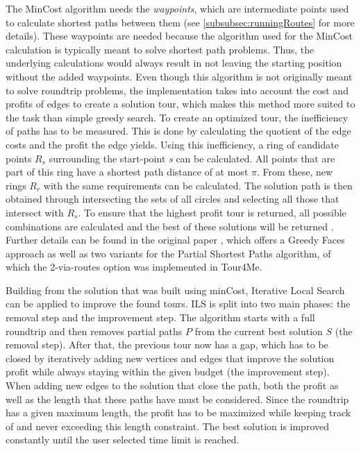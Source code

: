 The MinCost algorithm \cite{buchin_tour4me_2022, gemsa_efficient_2013} needs the \textit{waypoints}, which are intermediate points used to calculate shortest paths between them (see \ref{subsubsec:runningRoutes} for more details).
These waypoints are needed because the algorithm used for the MinCost calculation is typically meant to solve shortest path problems. 
Thus, the underlying calculations would always result in not leaving the starting position without the added waypoints. 
Even though this algorithm is not originally meant to solve roundtrip problems, the implementation takes into account the cost and profits of edges to create a solution tour, which makes this method more suited to the task than simple greedy search.
To create an optimized tour, the inefficiency of paths has to be measured. 
This is done by calculating the quotient of the edge costs and the profit the edge yields. 
Using this inefficiency, a ring of candidate points $R_s$ surrounding the start-point \textit{s} can be calculated.
All points that are part of this ring have a shortest path distance of at most $\pi$.
From these, new rings $R_r$ with the same requirements can be calculated. 
The solution path is then obtained through intersecting the sets of all circles and selecting all those that intersect with $R_s$.
To ensure that the highest profit tour is returned, all possible combinations are calculated and the best of these solutions will be returned \cite{buchin_tour4me_2022}. 
Further details can be found in the original paper \cite{gemsa_efficient_2013}, which offers a Greedy Faces approach as well as two variants for the Partial Shortest Paths algorithm, of which the 2-via-routes option was implemented in Tour4Me.

Building from the solution that was built using minCost, Iterative Local Search \cite{buchin_tour4me_2022, lu_arc_2015, verbeeck_extension_2014} can be applied to improve the found tours.
ILS is split into two main phases: the removal step and the improvement step.
The algorithm starts with a full roundtrip and then removes partial paths $P$ from the current best solution $S$ (the removal step).
After that, the previous tour now has a gap, which has to be closed by iteratively adding new vertices and edges that improve the solution profit while always staying within the given budget (the improvement step).
When adding new edges to the solution that close the path, both the profit as well as the length that these paths have must be considered. 
Since the roundtrip has a given maximum length, the profit has to be maximized while keeping track of and never exceeding this length constraint.
The best solution is improved constantly until the user selected time limit is reached.

